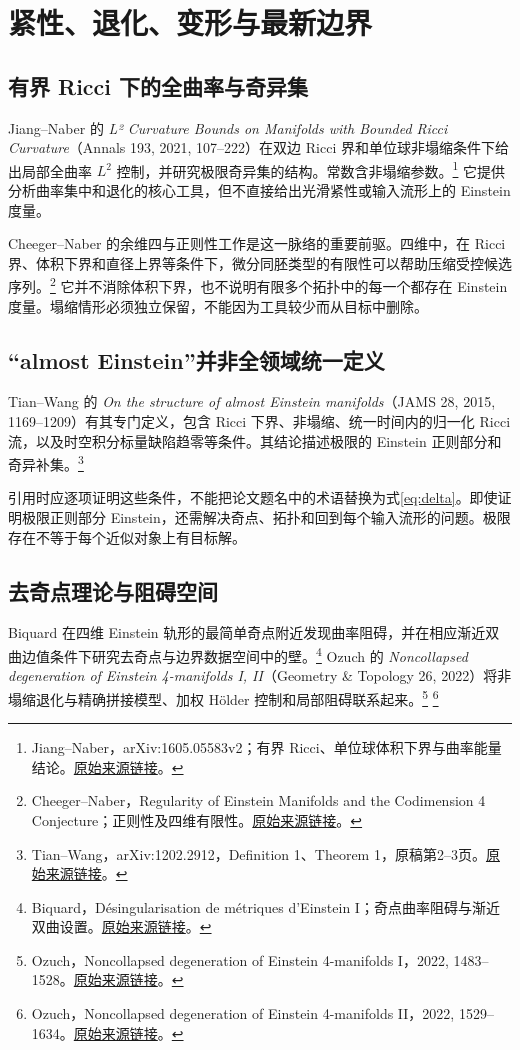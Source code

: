\documentclass[11pt,a4paper]{article}
\theoremstyle{definition}
\newcommand{\src}[3]{\footnote{\raggedright #1，#2。\href{#3}{原始来源链接}。}}
\begin{document}
\section{紧性、退化、变形与最新边界}\label{sec:frontier}

\subsection{有界 Ricci 下的全曲率与奇异集}

Jiang--Naber 的 \emph{L² Curvature Bounds on Manifolds with Bounded Ricci Curvature}（Annals 193, 2021, 107--222）在双边 Ricci 界和单位球非塌缩条件下给出局部全曲率 $L^2$ 控制，并研究极限奇异集的结构。常数含非塌缩参数。\src{Jiang--Naber}{arXiv:1605.05583v2；有界 Ricci、单位球体积下界与曲率能量结论}{https://arxiv.org/abs/1605.05583v2}
它提供分析曲率集中和退化的核心工具，但不直接给出光滑紧性或输入流形上的 Einstein 度量。

Cheeger--Naber 的余维四与正则性工作是这一脉络的重要前驱。四维中，在 Ricci 界、体积下界和直径上界等条件下，微分同胚类型的有限性可以帮助压缩受控候选序列。\src{Cheeger--Naber}{Regularity of Einstein Manifolds and the Codimension 4 Conjecture；正则性及四维有限性}{https://arxiv.org/abs/1406.6534}
它并不消除体积下界，也不说明有限多个拓扑中的每一个都存在 Einstein 度量。塌缩情形必须独立保留，不能因为工具较少而从目标中删除。

\subsection{“almost Einstein”并非全领域统一定义}

Tian--Wang 的 \emph{On the structure of almost Einstein manifolds}（JAMS 28, 2015, 1169--1209）有其专门定义，包含 Ricci 下界、非塌缩、统一时间内的归一化 Ricci 流，以及时空积分标量缺陷趋零等条件。其结论描述极限的 Einstein 正则部分和奇异补集。\src{Tian--Wang}{arXiv:1202.2912，Definition 1、Theorem 1，原稿第2--3页}{https://arxiv.org/abs/1202.2912}

引用时应逐项证明这些条件，不能把论文题名中的术语替换为式\eqref{eq:delta}。即使证明极限正则部分 Einstein，还需解决奇点、拓扑和回到每个输入流形的问题。极限存在不等于每个近似对象上有目标解。

\subsection{去奇点理论与阻碍空间}

Biquard 在四维 Einstein 轨形的最简单奇点附近发现曲率阻碍，并在相应渐近双曲边值条件下研究去奇点与边界数据空间中的壁。\src{Biquard}{Désingularisation de métriques d'Einstein I；奇点曲率阻碍与渐近双曲设置}{https://arxiv.org/abs/1105.4904}
Ozuch 的 \emph{Noncollapsed degeneration of Einstein 4-manifolds I, II}（Geometry \& Topology 26, 2022）将非塌缩退化与精确拼接模型、加权 Hölder 控制和局部阻碍联系起来。\src{Ozuch}{Noncollapsed degeneration of Einstein 4-manifolds I，2022, 1483--1528}{https://doi.org/10.2140/gt.2022.26.1483}
\src{Ozuch}{Noncollapsed degeneration of Einstein 4-manifolds II，2022, 1529--1634}{https://doi.org/10.2140/gt.2022.26.1529}
\end{document}

